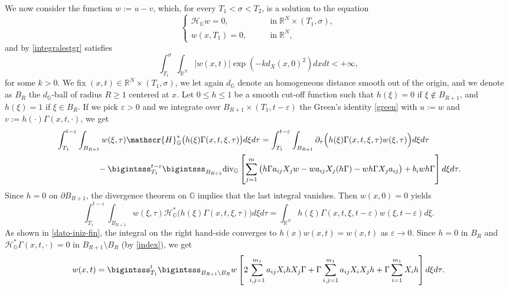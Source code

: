 \documentclass[11pt,a4paper]{article}
\numberwithin{equation}{section}
\def \rn {{\mathbb {R}}^{N}}
\def \s {\sigma}
\def \GG {{\mathbb{G}}}
\def \div {{\text{\rm div}}}
\def \p {\partial}
\def \H {\mathscr{H}_\GG}
\def \HH{\mathscr{H}_\GG^*}
\def \G {{\Gamma}}
\def \e {{\varepsilon}}
\def \t {{\tau}}
\def \x {{\xi}}
\begin{document}
\begin{pf-fundamental}
	
	We now consider the function $w:=u-v$, which, for every $T_1<\s<T_2$, is a solution to the equation
	\begin{equation}
		\begin{cases}
			\H w =0, \qquad &\mathrm{in}\;\rn\times(T_1,\s),\\      
			w(x,T_1)=0,\qquad &\mathrm{in}\;\rn,
		\end{cases}
	\end{equation}
	and by \eqref{integralestgr} satisfies
	\begin{equation}\label{intestgr}
		\int_{T_1}^{\s}\int_{\rn} |w(x,t)|\exp\left({-kd_X(x,0)^2}\right)dxdt<+\infty,
	\end{equation}
	for some $k>0$. We fix $(x,t)\in \rn\times (T_1,\s)$,  we let again $d_{\GG}$ denote an homogeneous distance smooth out of the origin, and we  denote as $B_R$ the  $d_{\GG}$-ball of radius $R\geq 1$ centered at $x$. Let $0\leq h \leq 1$  be a smooth cut-off function such that $h(\x)=0$ if $\xi \notin B_{R+1}$, and  $h(\x)=1$ if $\xi \in B_{R}$. If we pick $\e>0$ and we integrate over $B_{R+1}\times (T_1,t-\e)$ the Green's identity \eqref{green} with $u:=w$ and $v:=h(\cdot)\G(x,t,\cdot)$, we get
	\begin{equation}
		\begin{aligned}
			&\int_{T_1}^{t-\e}\int_{B_{R+1}}w(\x,\t)\HH\big(h(\x)\G(x,t,\x,\t)\big)d\x d\t=\int_{T_1}^{t-\e}\int_{B_{R+1}}\p_\t\Big(h(\x)\G(x,t,\x,\t) w(\x,\t)\Big)d\x d\t\\
			&\qquad\quad\qquad-\bigintsss_{T_1}^{t-\e}\bigintsss_{B_{R+1}}\div_\GG\left[\sum_{j=1}^m\big(h\G a_{ij}X_jw-w a_{ij}X_j(h\G)-wh\G X_ja_{ij}\big)+b_iwh\G\right]d\x d\t.
		\end{aligned}
	\end{equation} 
	Since $h=0$ on  $\p B_{R+1}$, the divergence theorem on $\GG$ implies that the last integral vanishes. Then $w(x,0)=0$ yields
	\begin{equation}
		\int_{T_1}^{t-\e}\int_{B_{R+1}}w(\x,\t)\HH\big(h(\x)\G(x,t,\x,\t)\big)d\x d\t=\int_{\rn}h(\x)\G(x,t,\x,t-\e) w(\x,t-\e) d\x. 
	\end{equation}
	As shown in \eqref{dato-iniz-fin}, the integral on the right hand-side converges to $h(x)w(x,t)=w(x,t)$ as $\e\rightarrow 0$. Since $h=0$ in $B_R$ and $\HH\G(x,t,\cdot)=0$ in $B_{R+1}\setminus B_R$ (by \eqref{index}), we get 
	\begin{equation}
		w(x,t)=\bigintsss_{T_1}^{t}\bigintsss_{B_{R+1}\setminus B_R}w\left[2\sum_{i,j=1}^{m_1}a_{ij}X_ihX_j\G+\G\sum_{i,j=1}^{m_1}a_{ij}X_iX_jh+\G\sum_{i=1}^{m_1}X_ih\right]d\xi d\t.

\end{equation}
\end{pf-fundamental}
\end{document}
